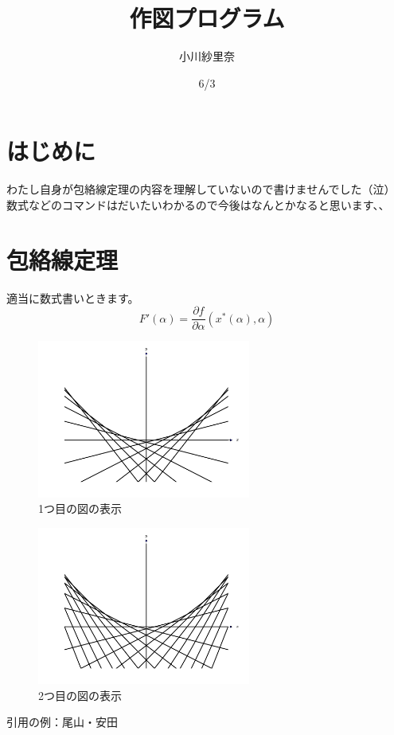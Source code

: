 \documentclass[11pt,a4j,fleqn]{jarticle}
\title{作図プログラム}
\author{小川紗里奈}
\date{6/3}
\begin{document}
\maketitle

\section{はじめに}

わたし自身が包絡線定理の内容を理解していないので書けませんでした（泣）
数式などのコマンドはだいたいわかるので今後はなんとかなると思います、、

\section{包絡線定理}

適当に数式書いときます。
\[ F'(\alpha) = \frac{\partial f}{\partial \alpha}(x^*(\alpha), \alpha) \]

\begin{figure}[H]
 \centering
 \includegraphics[width = 7cm]{envelope0.pdf}
 \caption{1つ目の図の表示}
 \label{fig:1}
\end{figure}

\begin{figure}[H]
 \centering
 \includegraphics[width = 7cm]{envelope1.pdf}
 \caption{2つ目の図の表示}
 \label{fig:2}
\end{figure}



引用の例：尾山・安田\cite{OyamaYasuda11}
\end{document}
